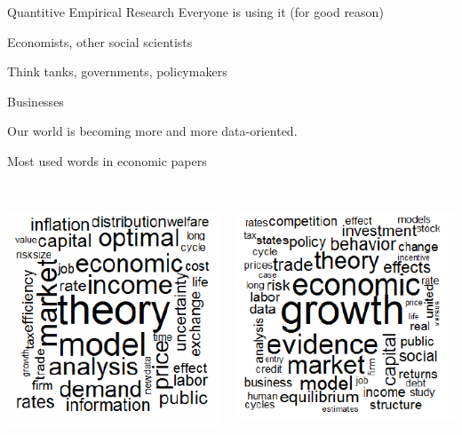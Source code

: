 \documentclass{./../div_teaching_slides}
\begin{document}
\begin{frame}{Quantitive Empirical Research}
Everyone is using it (for good reason) \\
\begin{witemize}
\item Economists, other social scientists
\item Think tanks, governments, policymakers 
\item Businesses 
\end{witemize}
Our world is becoming more and more data-oriented.
\end{frame}

\begin{frame}{Most used words in economic papers}
\vspace{1.5em}
\begin{columns}
\begin{column}[c]{0.3\textwidth}
\centering
{} \\ \vspace{0.75em}
\includegraphics[scale=0.4]{1970.png}
\end{column}
\begin{column}[c]{0.3\textwidth}
\centering
{} \\ \vspace{0.75em}
\includegraphics[scale=0.4]{1990.png}

\end{column}
\end{columns}
\end{frame}
\end{document}
